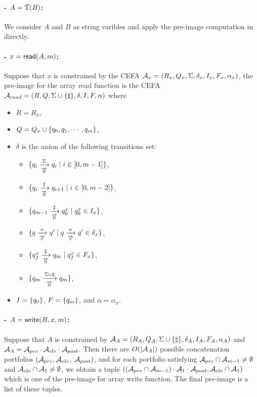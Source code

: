 {\paragraph{- $A = \mathfrak{T}(B)$:} We consider $A$ and $B$ as string varibles and apply the pre-image computation in \cite{ostrich} directly.

\paragraph{- $x = \mathsf{read}(A, m)$:} Suppose that $x$ is constrained by the CEFA $\mathcal{A}_x=(R_x, Q_x, \Sigma, \delta_x, I_x, F_x, \alpha_x)$, the pre-image for the array read function is the CEFA $\mathcal{A}_{read}=(R, Q, \Sigma\cup\{\sharp\}, \delta, I, F, \alpha)$ where
\begin{itemize}
	\item $R = R_x$,
	\item $Q = Q_x\cup\{q_0, q_1, \cdots, q_{m}\}$,
	\item $\delta$ is the union of the following transitions set:
	\begin{itemize}
		\item $\{q_i\xrightarrow[\overrightarrow{0}]{\Sigma}q_i\mid i\in [0, m-1]\}$,
		\item $\{q_i\xrightarrow[\overrightarrow{0}]{\sharp}q_{i+1}\mid i\in[0,m-2]\}$,
		\item $\{q_{m-1}\xrightarrow[\overrightarrow{0}]{\sharp}q_0^x \mid q_0^x\in I_x\}$,
		\item $\{q\xrightarrow[\overrightarrow{v}]{a}q'\mid q\xrightarrow[\overrightarrow{v}]{a}q'\in \delta_x\}$,
		\item $\{q_f^x\xrightarrow[\overrightarrow{0}]{\sharp}q_m \mid q_f^x\in F_x\}$,
		\item $\{q_m\xrightarrow[\overrightarrow{0}]{\Sigma\cup\sharp} q_m\}$,
	\end{itemize}
	\item $I = \{q_0\}$, $F = \{q_m\}$, and $\alpha = \alpha_x$.
\end{itemize}

\paragraph{- $A = \mathsf{write}(B, x, m)$:} Suppose that $A$ is constrained by $\mathcal{A}_A=(R_A, Q_A, \Sigma\cup\{\sharp\}, \delta_A, I_A, F_A, \alpha_A)$ and $\mathcal{A}_A = \mathcal{A}_{pre}\cdot\mathcal{A}_{ele}\cdot\mathcal{A}_{post}$. Then there are $O(|\mathcal{A}_A|)$ possible concatenation portfolios $(\mathcal{A}_{pre},\mathcal{A}_{ele}$, $\mathcal{A}_{post})$, and for each portfolio satisfying $\mathcal{A}_{pre}\cap\mathcal{A}_{m-1}\not=\emptyset$ and $\mathcal{A}_{ele}\cap\mathcal{A}_1\not=\emptyset$, we obtain a tuple $((\mathcal{A}_{pre}\cap\mathcal{A}_{m-1})\cdot\mathcal{A}_1\cdot\mathcal{A}_{post}, \mathcal{A}_{ele}\cap\mathcal{A}_1)$ which is one of the pre-image for array write function. The final pre-image is a list of these tuples.

}
